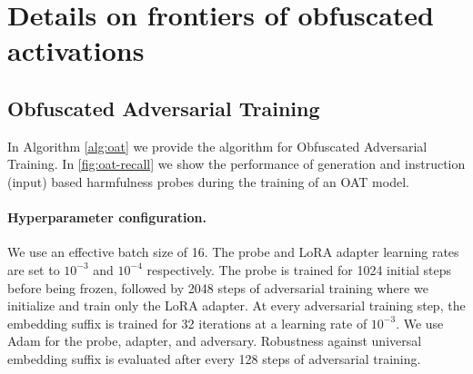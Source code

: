 \documentclass{article}
\begin{document}
\section{Details on frontiers of obfuscated activations}\label{sec:frontier-details}

\subsection{Obfuscated Adversarial Training}
\label{sec:oat-details}

In Algorithm \ref{alg:oat} we provide the algorithm for 
Obfuscated Adversarial Training. In \cref{fig:oat-recall} 
we show the performance of generation and instruction 
(input) based harmfulness probes during the training 
of an OAT model.


\paragraph{Hyperparameter configuration.}
We use an effective batch size of 16. The probe
and LoRA adapter learning rates are set to $10^{-3}$ and
$10^{-4}$ respectively. The probe is trained for 1024
initial steps before being frozen, followed by 2048 steps
of adversarial training where we initialize and train only the LoRA adapter. At every adversarial training step, the embedding suffix is trained for 32 iterations at a learning rate of $10^{-3}$. We use Adam for the probe, adapter, and adversary. Robustness against universal embedding suffix is evaluated after every 128 steps of adversarial training.
\end{document}
